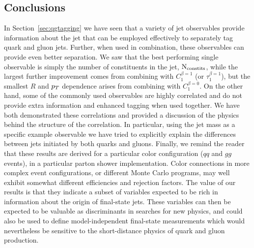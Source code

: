  \subsection{Conclusions}\label{sec:qg_concl}

In Section~\ref{sec:qgtagging} we have seen that a variety of jet observables
 provide information about the jet that can be employed effectively to separately tag quark and gluon jets.  Further,
when used in combination, these observables can provide even better separation.  We saw that the best performing single observable is simply the number of
constituents in the jet, $\rm{N_ {constits}}$,  while the largest further improvement comes from combining with $C_1^{\beta =1}$ (or $\tau_1^{\beta=1}$), 
but the smallest
$R$ and $p_T$ dependence arises from combining with $C_1^{\beta = 0}$.  On the other hand, some of the commonly used observables are highly correlated
and do not provide extra information and enhanced tagging when used together.  We have both demonstrated these correlations and provided a discussion of the 
physics behind the structure of the correlation.  In particular, using the jet mass as a specific example observable we have tried to explicitly explain the differences between jets 
initiated by both quarks and gluons. 
Finally, we remind the reader that these results are derived for a particular color
configuration ($qq$ and $gg$ events), in a particular parton shower implementation. Color
connections in more complex event configurations, or different Monte Carlo programs,
may well exhibit somewhat different efficiencies and rejection factors. The value of our results
is that they indicate a subset of variables expected to be rich in information about
the origin of final-state jets. These variables can then be expected to be valuable as
discriminants in searches for new physics, and could also be used to define 
model-independent final-state measurements which would nevertheless be sensitive to the
short-distance physics of quark and gluon production.
 